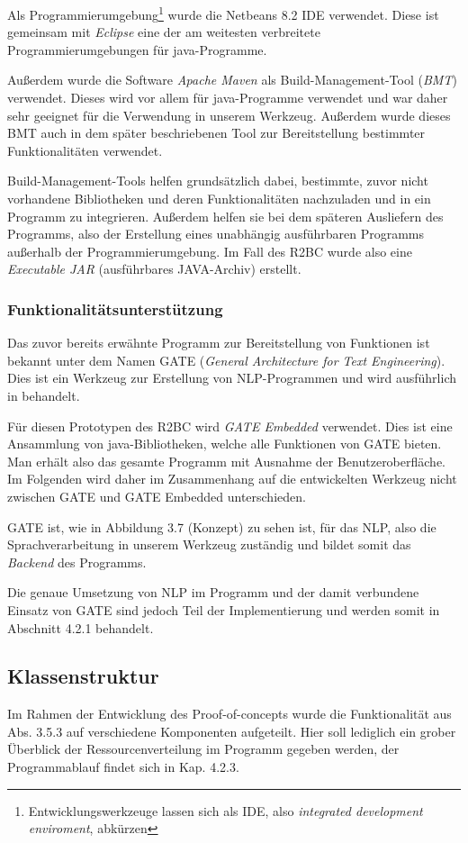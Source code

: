 \documentclass[12pt]{report}
\begin{document}
Als Programmierumgebung\footnote{Entwicklungswerkzeuge lassen sich als IDE, also \textit{integrated development enviroment}, abkürzen} wurde die Netbeans 8.2 IDE verwendet. Diese ist gemeinsam mit \textit{Eclipse} eine der am weitesten verbreitete Programmierumgebungen für java-Programme. 

Außerdem wurde die Software \textit{Apache Maven} als Build-Management-Tool (\textit{BMT}) verwendet. Dieses wird vor allem für java-Programme verwendet und war daher sehr geeignet für die Verwendung in unserem Werkzeug. Außerdem wurde dieses BMT auch in dem später beschriebenen Tool zur Bereitstellung bestimmter Funktionalitäten verwendet. 

Build-Management-Tools helfen grundsätzlich dabei, bestimmte, zuvor nicht vorhandene Bibliotheken und deren Funktionalitäten nachzuladen und in ein Programm zu integrieren. Außerdem helfen sie bei dem späteren Ausliefern des Programms, also der Erstellung eines unabhängig ausführbaren Programms außerhalb der Programmierumgebung.
Im Fall des R2BC wurde also eine \textit{Executable JAR} (ausführbares JAVA-Archiv) erstellt. 

\subsubsection{Funktionalitätsunterstützung}
Das zuvor bereits erwähnte Programm zur Bereitstellung von Funktionen ist bekannt unter dem Namen GATE (\textit{General Architecture for Text Engineering}). Dies ist ein Werkzeug zur Erstellung von NLP-Programmen und wird ausführlich in \cite{rs18} behandelt. 

Für diesen Prototypen des R2BC wird \textit{GATE Embedded} verwendet. Dies ist eine Ansammlung von java-Bibliotheken, welche alle Funktionen von GATE bieten. Man erhält also das gesamte Programm mit Ausnahme der Benutzeroberfläche. Im Folgenden wird daher im Zusammenhang auf die entwickelten Werkzeug nicht zwischen GATE und GATE Embedded unterschieden. 

GATE ist, wie in Abbildung 3.7 (Konzept) zu sehen ist, für das NLP, also die Sprachverarbeitung in unserem Werkzeug zuständig und bildet somit das \textit{Backend} des Programms.

Die genaue Umsetzung von NLP im Programm und der damit verbundene Einsatz von GATE sind jedoch Teil der Implementierung und werden somit in Abschnitt 4.2.1 behandelt.

\subsection{Klassenstruktur}
Im Rahmen der Entwicklung des Proof-of-concepts wurde die Funktionalität aus Abs. 3.5.3 auf verschiedene Komponenten aufgeteilt. Hier soll lediglich ein grober Überblick der Ressourcenverteilung im Programm gegeben werden, der Programmablauf findet sich in Kap. 4.2.3.
\end{document}
